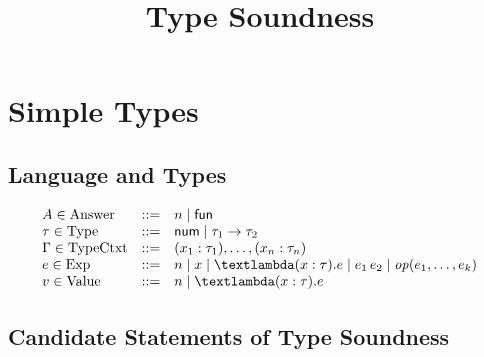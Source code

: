 \documentclass{article}
\title{Type Soundness}
\author{}
\date{}
\begin{document}
\maketitle

\section{Simple Types}
\subsection{Language and Types}

\[\begin{array}{lcl}
\NT{A}{Answer} \NTEq
    n \NTSep
    \LAFun
    \\
\NT{\Gt}{Type} \NTEq
    \TNum \NTSep
    \TArrow{\Gt_1}{\Gt_2}
    \\
\NT{\GG}{TypeCtxt} \NTEq
    (\TAnn{x_1}{\Gt_1}), \dots, (\TAnn{x_n}{\Gt_n})
    \\
\NT{e}{Exp} \NTEq
    n \NTSep
    x \NTSep
    \TFun{(\TAnn{x}{\Gt})}{e} \NTSep
    \TApp{e_1}{e_2} \NTSep
    \TOp{e_1,\dots,e_k}
    \\
\NT{v}{Value} \NTEq
    n \NTSep
    \TFun{(\TAnn{x}{\Gt})}{e}
\end{array}\]

\subsection{Candidate Statements of Type Soundness}
\end{document}
